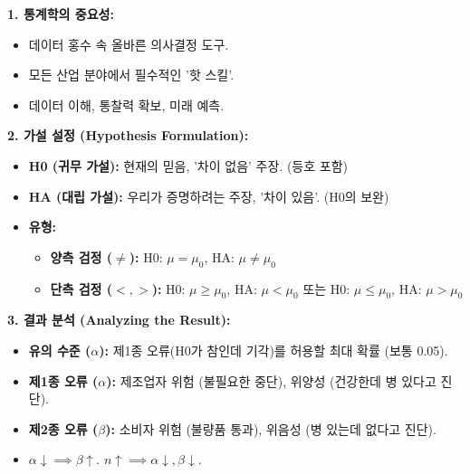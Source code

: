 \documentclass[11pt,a4paper]{book}
\theoremstyle{definition}
\begin{document}
\begin{tcolorbox}[colback=lightblue, colframe=darkblue, title={\textbf{모듈 1 핵심 요약: 가설 검정의 기초}}]

\textbf{1. 통계학의 중요성:}
\begin{itemize}
    \item 데이터 홍수 속 올바른 의사결정 도구.
    \item 모든 산업 분야에서 필수적인 '핫 스킬'.
    \item 데이터 이해, 통찰력 확보, 미래 예측.
\end{itemize}

\textbf{2. 가설 설정 (Hypothesis Formulation):}
\begin{itemize}
    \item \textbf{H0 (귀무 가설):} 현재의 믿음, '차이 없음' 주장. (등호 포함)
    \item \textbf{HA (대립 가설):} 우리가 증명하려는 주장, '차이 있음'. (H0의 보완)
    \item \textbf{유형:}
        \begin{itemize}
            \item \textbf{양측 검정 ($\ne$):} H0: $\mu = \mu_0$, HA: $\mu \ne \mu_0$
            \item \textbf{단측 검정 ($<, >$):} H0: $\mu \ge \mu_0$, HA: $\mu < \mu_0$ 또는 H0: $\mu \le \mu_0$, HA: $\mu > \mu_0$
        \end{itemize}
\end{itemize}

\textbf{3. 결과 분석 (Analyzing the Result):}
\begin{itemize}
    \item \textbf{유의 수준 ($\alpha$):} 제1종 오류(H0가 참인데 기각)를 허용할 최대 확률 (보통 0.05).
    \item \textbf{제1종 오류 ($\alpha$):} 제조업자 위험 (불필요한 중단), 위양성 (건강한데 병 있다고 진단).
    \item \textbf{제2종 오류 ($\beta$):} 소비자 위험 (불량품 통과), 위음성 (병 있는데 없다고 진단).
    \item $\alpha \downarrow \implies \beta \uparrow$. $n \uparrow \implies \alpha \downarrow, \beta \downarrow$.
\end{itemize}


\end{tcolorbox}
\end{document}

